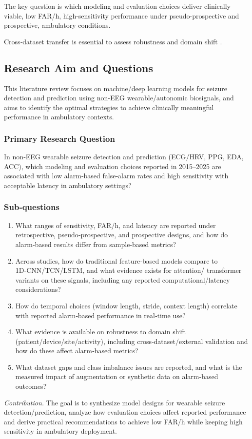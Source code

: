 The key question is which modeling and evaluation choices deliver
clinically viable, low FAR/h, high-sensitivity performance under
pseudo-prospective and prospective, ambulatory conditions.

Cross‑dataset transfer is essential to assess robustness and domain
shift \parencite{yangMultimodalAISystem2022,andradePerformanceSeizurePrediction2024}.

\subsection{Research Aim and Questions}
This literature review focuses on machine/deep learning models for seizure detection and prediction
using non-EEG wearable/autonomic biosignals, and aims to identify the optimal strategies to achieve clinically
meaningful performance in ambulatory contexts.

\vspace{0.5em}

\subsubsection{Primary Research Question}
In non‑EEG wearable seizure detection and prediction
(ECG/HRV, PPG, EDA, ACC), which modeling and evaluation choices
reported in 2015--2025 are associated with low alarm‑based false‑alarm
rates and high sensitivity with acceptable latency in ambulatory
settings?

\subsubsection{Sub‑questions}
\begin{enumerate}
  \item What ranges of sensitivity, FAR/h, and latency are reported
    under retrospective, pseudo‑prospective, and prospective designs,
    and how do alarm‑based results differ from sample‑based metrics?
  \item Across studies, how do traditional feature‑based models compare
    to 1D‑CNN/TCN/LSTM, and what evidence exists for attention/
    transformer variants on these signals, including any reported
    computational/latency considerations?
  \item How do temporal choices (window length, stride, context length)
    correlate with reported alarm‑based performance in real‑time use?
  \item What evidence is available on robustness to domain shift
    (patient/device/site/activity), including cross‑dataset/external
    validation and how do these affect alarm‑based metrics?
  \item What dataset gaps and class imbalance issues are reported, and
    what is the measured impact of augmentation or synthetic data on
    alarm‑based outcomes?
\end{enumerate}

\vspace{0.5em}
\noindent\textit{Contribution.} 
The goal is to synthesize model designs for wearable seizure detection/prediction, 
analyze how evaluation choices affect reported performance and derive practical
recommendations to achieve low FAR/h while keeping high sensitivity in
ambulatory deployment.
